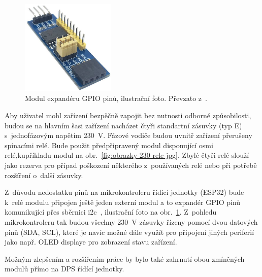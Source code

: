\begin{figure}[h!]
    \centering
    \includegraphics[width=0.4\textwidth]{obrazky/230/expander.jpg}
    \caption{Modul expandéru GPIO pinů, ilustrační foto. Převzato z~\cite{eshop-laskakit-expander}.}
    \label{fig:obrazky-230-expander-jpg}
\end{figure}

Aby uživatel mohl zařízení bezpěčně zapojit bez nutnosti odborné způsobilosti, budou se na hlavním šasi zařízení nacházet čtyři standartní zásuvky (typ E) s~jednofázovým napětím \qty{230}{V}. Fázové vodiče budou uvnitř zařízení přerušeny spínacími relé. Bude použit předpřipravený modul disponující osmi relé,kupříkladu modul na obr.~\ref{fig:obrazky-230-rele-jpg}. Zbylé čtyři relé slouží jako rezerva pro případ poškození některého z~používaných relé nebo při potřebě rozšíření o~další zásuvky. 

Z~důvodu nedostatku pinů na mikrokontroleru řídící jednotky (ESP32) bude k~relé modulu připojen ještě jeden externí modul a to expandér GPIO pinů komunikující přes sběrnici \acs{i2c}~\cite{eshop-laskakit-expander}, ilustrační foto na obr.~\ref{fig:obrazky-230-expander-jpg}. Z~pohledu mikrokontroleru tak budou všechny \qty{230}{V} zásuvky řízeny pomocí dvou datových pinů (SDA, SCL), které je navíc možné dále využít pro připojení jiných periferií jako např. OLED displaye pro zobrazení stavu zařízení. 

Možným zlepšením a rozšířením práce by bylo také zahrnutí obou zmíněných modulů přímo na DPS řídící jednotky. 


